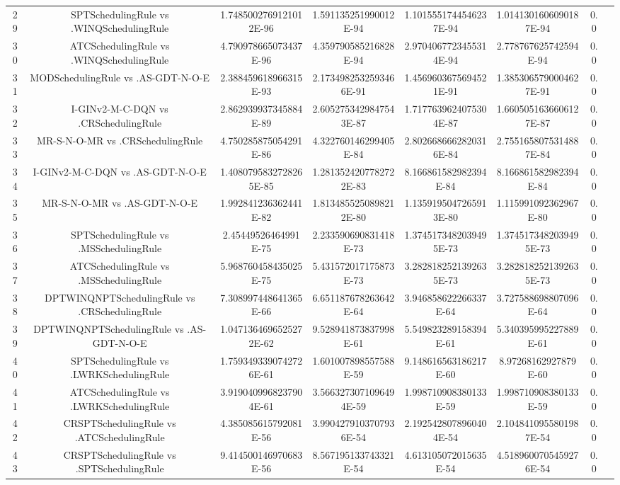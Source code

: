 \documentclass[a3paper,10pt]{article}
\begin{document}
\begin{table}[!htp]
\begin{tabular}{cccccccc}
29&SPTSchedulingRule vs .WINQSchedulingRule&1.7485002769121012E-96&1.591135251990012E-94&1.1015551744546237E-94&1.0141301606090187E-94&0.0\\
30&ATCSchedulingRule vs .WINQSchedulingRule&4.790978665073437E-96&4.359790585216828E-94&2.9704067723455314E-94&2.778767625742594E-94&0.0\\
31&MODSchedulingRule vs .AS-GDT-N-O-E&2.388459618966315E-93&2.1734982532593466E-91&1.4569603675694521E-91&1.3853065790004627E-91&0.0\\
32&I-GINv2-M-C-DQN vs .CRSchedulingRule&2.862939937345884E-89&2.6052753429847543E-87&1.7177639624075304E-87&1.6605051636606127E-87&0.0\\
33&MR-S-N-O-MR vs .CRSchedulingRule&4.750285875054291E-86&4.322760146299405E-84&2.8026686662820316E-84&2.7551658075314887E-84&0.0\\
34&I-GINv2-M-C-DQN vs .AS-GDT-N-O-E&1.4080795832728265E-85&1.2813524207782722E-83&8.166861582982394E-84&8.166861582982394E-84&0.0\\
35&MR-S-N-O-MR vs .AS-GDT-N-O-E&1.992841236362441E-82&1.8134855250898212E-80&1.1359195047265913E-80&1.115991092362967E-80&0.0\\
36&SPTSchedulingRule vs .MSSchedulingRule&2.45449526464991E-75&2.233590690831418E-73&1.3745173482039495E-73&1.3745173482039495E-73&0.0\\
37&ATCSchedulingRule vs .MSSchedulingRule&5.968760458435025E-75&5.431572017175873E-73&3.2828182521392635E-73&3.2828182521392635E-73&0.0\\
38&DPTWINQNPTSchedulingRule vs .CRSchedulingRule&7.308997448641365E-66&6.651187678263642E-64&3.946858622266337E-64&3.727588698807096E-64&0.0\\
39&DPTWINQNPTSchedulingRule vs .AS-GDT-N-O-E&1.0471364696525272E-62&9.528941873837998E-61&5.549823289158394E-61&5.340395995227889E-61&0.0\\
40&SPTSchedulingRule vs .LWRKSchedulingRule&1.7593493390742726E-61&1.601007898557588E-59&9.148616563186217E-60&8.97268162927879E-60&0.0\\
41&ATCSchedulingRule vs .LWRKSchedulingRule&3.9190409968237904E-61&3.5663273071096494E-59&1.998710908380133E-59&1.998710908380133E-59&0.0\\
42&CRSPTSchedulingRule vs .ATCSchedulingRule&4.385085615792081E-56&3.9904279103707936E-54&2.1925428078960404E-54&2.1048410955801987E-54&0.0\\
43&CRSPTSchedulingRule vs .SPTSchedulingRule&9.414500146970683E-56&8.567195133743321E-54&4.613105072015635E-54&4.5189600705459276E-54&0.0\\

\end{tabular}
\end{table}
\end{document}

